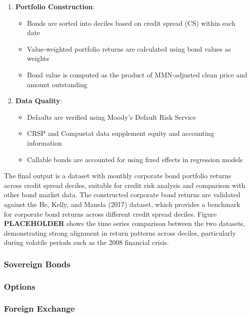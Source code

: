 \documentclass{article}
\begin{document}
\begin{appendices}
\begin{enumerate}
    \item \textbf{Portfolio Construction}:
    \begin{itemize}
        \item Bonds are sorted into deciles based on credit spread (CS) within each date
        \item Value-weighted portfolio returns are calculated using bond values as weights
        \item Bond value is computed as the product of MMN-adjusted clean price and amount outstanding
    \end{itemize}

    \item \textbf{Data Quality}:
    \begin{itemize}
        \item Defaults are verified using Moody's Default Risk Service
        \item CRSP and Compustat data supplement equity and accounting information
        \item Callable bonds are accounted for using fixed effects in regression models
    \end{itemize}
\end{enumerate}

The final output is a dataset with monthly corporate bond portfolio returns across credit spread deciles, suitable for credit risk analysis and comparison with other bond market data.
The constructed corporate bond returns are validated against the He, Kelly, and Manela (2017) dataset, which provides a benchmark for corporate bond returns across different credit spread deciles. Figure \textbf{PLACEHOLDER} shows the time series comparison between the two datasets, demonstrating strong alignment in return patterns across deciles, particularly during volatile periods such as the 2008 financial crisis.

\subsubsection{Sovereign Bonds}
\label{sec:sovereign}

\subsubsection{Options}
\label{sec:options}

\subsubsection{Foreign Exchange}
\label{sec:fx}


\end{appendices}
\end{document}
